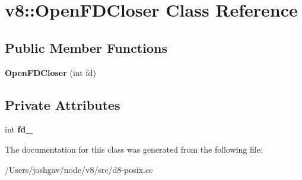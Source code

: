 \hypertarget{classv8_1_1_open_f_d_closer}{}\section{v8\+:\+:Open\+F\+D\+Closer Class Reference}
\label{classv8_1_1_open_f_d_closer}
\subsection*{Public Member Functions}
\begin{DoxyCompactItemize}
\item 
{\bfseries Open\+F\+D\+Closer} (int fd)\hypertarget{classv8_1_1_open_f_d_closer_a06963560af61d526b81e31c4aae610a9}{}\label{classv8_1_1_open_f_d_closer_a06963560af61d526b81e31c4aae610a9}

\end{DoxyCompactItemize}
\subsection*{Private Attributes}
\begin{DoxyCompactItemize}
\item 
int {\bfseries fd\+\_\+}\hypertarget{classv8_1_1_open_f_d_closer_a8a0d56d71490cd676f4ae298cd80a108}{}\label{classv8_1_1_open_f_d_closer_a8a0d56d71490cd676f4ae298cd80a108}

\end{DoxyCompactItemize}


The documentation for this class was generated from the following file\+:\begin{DoxyCompactItemize}
\item 
/\+Users/joshgav/node/v8/src/d8-\/posix.\+cc\end{DoxyCompactItemize}
